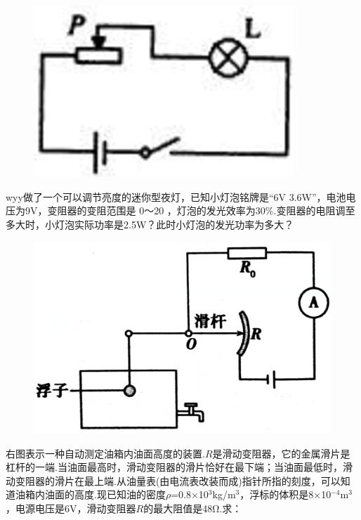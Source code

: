 \documentclass[11pt,a4paper]{article}
\newcommand{\nianfen}[1]{\hspace{-2em}{(#1\textbf{·}\textit{青岛})}}
\begin{document}
	\rule{0em}{15em}
	
	\begin{figure}
		\includegraphics[width=\linewidth]{2004}
	\end{figure}

	\nianfen{2004}wyy做了一个可以调节亮度的迷你型夜灯，已知小灯泡铭牌是“6V 3.6W”，电池电压为9V，变阻器的变阻范围是
	0～20 ，灯泡的发光效率为30\%.变阻器的电阻调至 多大时，小灯泡实际功率是2.5W？此时小灯泡的发光功率为多大？
	\clearpage
	
	\begin{figure}
		\includegraphics[width=\linewidth]{2003}
		
	\end{figure}

	\nianfen{2003}右图表示一种自动测定油箱内油面高度的装置.$ R $是滑动变阻器，它的金属滑片是杠杆的一端.当油面最高时，滑动变阻器的滑片恰好在最下端；当油面最低时，滑动变阻器的滑片在最上端.从油量表(由电流表改装而成)指针所指的刻度，可以知道油箱内油面的高度.现已知油的密度$\rho$=0.8×10$^3$kg/m$^3$，浮标的体积是8×10$^{-4}$m$^3$，电源电压是6V，滑动变阻器$ R $的最大阻值是48Ω.求：
	
\end{document}
